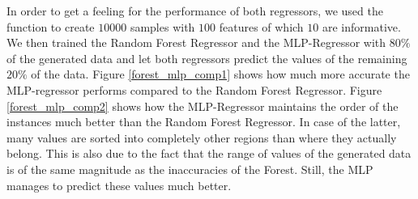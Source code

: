	In order to get a feeling for the performance of both regressors, we used the function  to create $10000$ samples with $100$ features of which $10$ are informative. We then trained the Random Forest Regressor and the MLP-Regressor with $80\%$ of the generated data and let both regressors predict the values of the remaining $20\%$ of the data. Figure \ref{forest_mlp_comp1} shows how much more accurate the MLP-regressor performs compared to the Random Forest Regressor. Figure \ref{forest_mlp_comp2} shows how the MLP-Regressor maintains the order of the instances much better than the Random Forest Regressor. In case of the latter, many values are sorted into completely other regions than where they actually belong. This is also due to the fact that the range of values of the generated data is of the same magnitude as the inaccuracies of the Forest. Still, the MLP manages to predict these values much better.

	